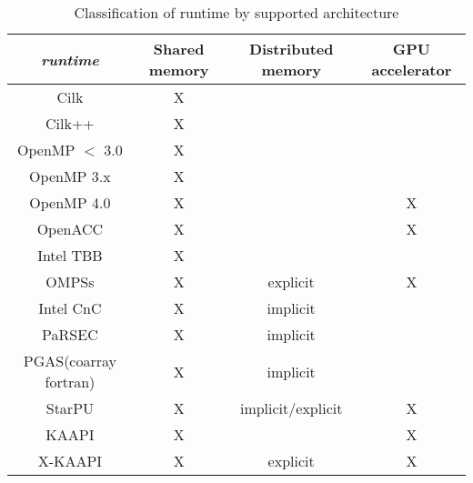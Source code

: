 \begin{table}[h!]
\centering
\begin{tabular}{c|ccc}
  \textit{runtime} & Shared memory & Distributed memory & GPU accelerator \\
\hline
        Cilk           & X &           &   \\
        Cilk++         & X &           &   \\
        OpenMP $<$ 3.0 & X &           &   \\
        OpenMP 3.x     & X &           &   \\
        OpenMP 4.0     & X &           & X \\
        OpenACC        & X &           & X \\
        Intel TBB      & X &           &   \\
        OMPSs          & X & explicit  & X \\
        Intel CnC      & X & implicit  &   \\
        PaRSEC         & X & implicit  &   \\
 PGAS(coarray fortran) & X & implicit  &   \\
        StarPU         & X & implicit/explicit  & X \\
        KAAPI          & X &           & X \\
        X-KAAPI        & X & explicit  & X
\end{tabular}
\caption{Classification of runtime by supported architecture}
\label{tab:runtime_archi}
\end{table}
